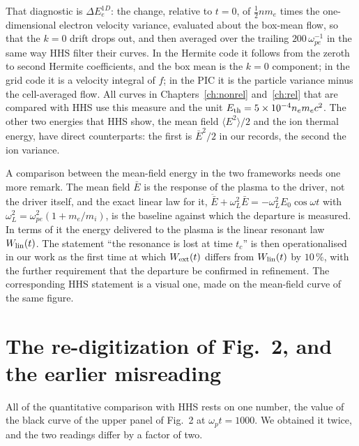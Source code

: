 That diagnostic is $\Delta E_e^{1D}$: the change, relative to $t=0$, of $\tfrac12 n m_e$ times the one-dimensional electron velocity variance, evaluated about the box-mean flow, so that the $k=0$ drift drops out, and then averaged over the trailing $200\,\omega_{pe}^{-1}$ in the same way HHS filter their curves. In the Hermite code it follows from the zeroth to second Hermite coefficients, and the box mean is the $k=0$ component; in the grid code it is a velocity integral of $f$; in the PIC it is the particle variance minus the cell-averaged flow. All curves in Chapters~\ref{ch:nonrel} and~\ref{ch:rel} that are compared with HHS use this measure and the unit $E_{\rm th}=5\times10^{-4}n_em_ec^2$. The other two energies that HHS show, the mean field $\langle E^2\rangle/2$ and the ion thermal energy, have direct counterparts: the first is $\bar E^2/2$ in our records, the second the ion variance.

A comparison between the mean-field energy in the two frameworks needs one more remark. The mean field $\bar E$ is the response of the plasma to the driver, not the driver itself, and the exact linear law for it, $\ddot{\bar E}+\omega_L^2\bar E=-\omega_L^2E_0\cos\omega t$ with $\omega_L^2=\omega_{pe}^2(1+m_e/m_i)$, is the baseline against which the departure is measured. In terms of it the energy delivered to the plasma is the linear resonant law $W_{\rm lin}(t)$. The statement ``the resonance is lost at time $t_c$'' is then operationalised in our work as the first time at which $W_{\rm ext}(t)$ differs from $W_{\rm lin}(t)$ by $10\,\%$, with the further requirement that the departure be confirmed in refinement. The corresponding HHS statement is a visual one, made on the mean-field curve of the same figure.

\section{The re-digitization of Fig.~2, and the earlier misreading}

All of the quantitative comparison with HHS rests on one number, the value of the black curve of the upper panel of Fig.~2 at $\omega_pt=1000$. We obtained it twice, and the two readings differ by a factor of two.

